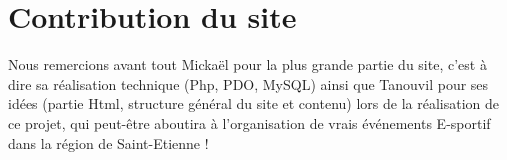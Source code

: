 \documentclass[a4paper, 11pt]{article}
\begin{document}
\section{Contribution du site}
Nous remercions avant tout Mickaël pour la plus grande partie du site, c'est à dire sa réalisation technique (Php, PDO, MySQL) ainsi que Tanouvil pour ses idées (partie Html, structure général du site et contenu) lors de la réalisation de ce projet, qui peut-être aboutira à l'organisation de vrais événements E-sportif dans la région de Saint-Etienne !
\end{document}
